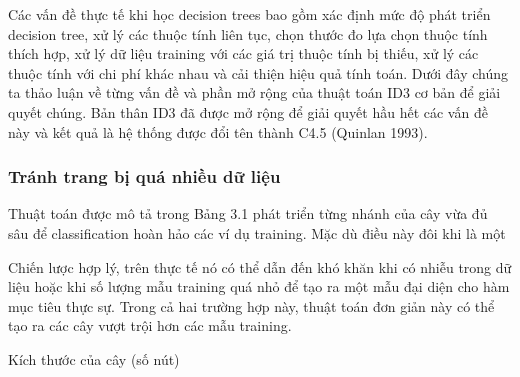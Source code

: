 Các vấn đề thực tế khi học decision trees bao gồm xác định mức độ phát triển decision tree, xử lý các thuộc tính liên tục, chọn thước đo lựa chọn thuộc tính thích hợp, xử lý dữ liệu training với các giá trị thuộc tính bị thiếu, xử lý các thuộc tính với chi phí khác nhau và cải thiện hiệu quả tính toán. Dưới đây chúng ta thảo luận về từng vấn đề và phần mở rộng của thuật toán ID3 cơ bản để giải quyết chúng. Bản thân ID3 đã được mở rộng để giải quyết hầu hết các vấn đề này và kết quả là hệ thống được đổi tên thành C4.5 (Quinlan 1993).

\subsubsection{Tránh trang bị quá nhiều dữ liệu}

Thuật toán được mô tả trong Bảng 3.1 phát triển từng nhánh của cây vừa đủ sâu để classification hoàn hảo các ví dụ training. Mặc dù điều này đôi khi là một

Chiến lược hợp lý, trên thực tế nó có thể dẫn đến khó khăn khi có nhiễu trong dữ liệu hoặc khi số lượng mẫu training quá nhỏ để tạo ra một mẫu đại diện cho hàm mục tiêu thực sự. Trong cả hai trường hợp này, thuật toán đơn giản này có thể tạo ra các cây vượt trội hơn các mẫu training.

Kích thước của cây (số nút)

